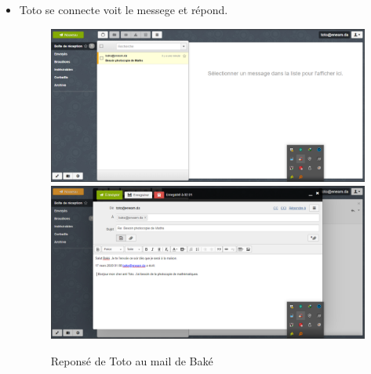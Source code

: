 \documentclass[a4paper,12pt,french]{report} %
\begin{document}
\begin{itemize}
\item Toto se connecte voit le messege et répond.
\begin{figure}[H]
\centering
\includegraphics[scale=0.5]{figure/toto_see_mail_from_bake1.png} \\[1cm]
\includegraphics[scale=0.5]{figure/toto_reply_to_bake1.png}
\caption{Reponsé de Toto au mail de Baké}
\end{figure} 


\end{itemize}
\end{document}
